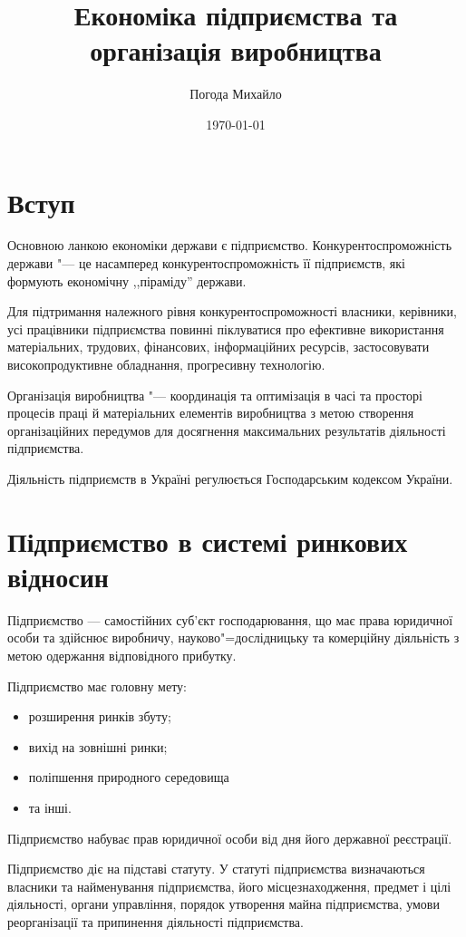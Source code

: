\documentclass[a5paper,10pt,notitlepage,pdftex,headsepline]{scrartcl}
\author{Погода Михайло}
\title{Економіка підприємства та організація виробництва}
\date{\today}
\begin{document}
  \maketitle

\section{Вступ}
  Основною ланкою економіки держави є підприємство.
  Конкурентоспроможність держави "--- це насамперед конкурентоспроможність її
  підприємств, які формують економічну ,,піраміду'' держави.

  Для підтримання належного рівня конкурентоспроможності власники, керівники,
  усі працівники підприємства повинні піклуватися про ефективне використання
  матеріальних, трудових, фінансових, інформаційних ресурсів, застосовувати
  високопродуктивне обладнання, прогресивну технологію.

  Організація виробництва "--- координація та оптимізація в часі та просторі
  процесів праці й матеріальних елементів виробництва з метою створення
  організаційних передумов для досягнення максимальних результатів діяльності
  підприємства.

  Діяльність підприємств в Україні регулюється Господарським кодексом України.

\section{Підприємство в системі ринкових відносин}

  Підприємство --- самостійних суб’єкт господарювання, що має права
  юридичної особи та здійснює виробничу, науково"=дослідницьку та комерційну
  діяльність з метою одержання відповідного прибутку.

  Підприємство має головну мету:
  \begin{itemize}
    \item розширення ринків збуту;
    \item вихід на зовнішні ринки;
    \item поліпшення природного середовища
    \item та інші.
  \end{itemize}

  Підприємство набуває прав юридичної особи від дня його державної
  реєстрації.

  Підприємство діє на підставі статуту.
  У статуті підприємства визначаються власники та найменування підприємства,
  його місцезнаходження, предмет і цілі діяльності, органи управління,
  порядок утворення майна підприємства, умови реорганізації та припинення
  діяльності підприємства.
\end{document}
